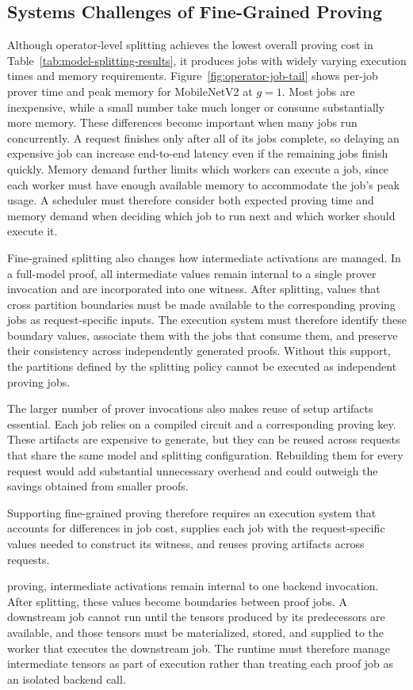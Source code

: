 \subsection{Systems Challenges of Fine-Grained Proving}
Although operator-level splitting achieves the lowest overall proving
cost in Table~\ref{tab:model-splitting-results}, it produces jobs with
widely varying execution times and memory requirements. Figure~\ref{fig:operator-job-tail} shows per-job prover time and
peak memory for MobileNetV2 at \(g=1\).  Most jobs are inexpensive, while a small number take much
longer or consume substantially more memory. These differences become
important when many jobs run concurrently. A request finishes only after
all of its jobs complete, so delaying an expensive job can
increase end-to-end latency even if the remaining jobs finish quickly.
Memory demand further limits which workers can execute a job, since each
worker must have enough available memory to accommodate the job's peak
usage. A scheduler must therefore consider both expected proving time
and memory demand when deciding which job to run next and which worker
should execute it.

Fine-grained splitting also changes how intermediate activations are
managed. In a full-model proof, all intermediate values remain internal
to a single prover invocation and are incorporated into one witness.
After splitting, values that cross partition boundaries must be made
available to the corresponding proving jobs as request-specific inputs.
The execution system must therefore identify these boundary values,
associate them with the jobs that consume them, and preserve their
consistency across independently generated proofs. Without this support,
the partitions defined by the splitting policy cannot be executed as
independent proving jobs.


The larger number of prover invocations also makes reuse of setup
artifacts essential. Each job relies on a compiled circuit and a
corresponding proving key. These artifacts are expensive to generate, but
they can be reused across requests that share the same model and
splitting configuration. Rebuilding them for every request would add
substantial unnecessary overhead and could outweigh the savings obtained
from smaller proofs.

Supporting fine-grained proving therefore requires an execution system
that accounts for differences in job cost, supplies each job with the
request-specific values needed to construct its witness, and reuses
proving artifacts across requests.

proving, intermediate activations remain internal to one backend invocation. After splitting, these values become boundaries between proof jobs. A downstream job cannot run until the tensors produced by its predecessors are available, and those tensors must be materialized, stored, and supplied to the worker that executes the downstream job. The runtime must therefore manage intermediate tensors as part of execution rather than treating each proof job as an isolated backend call.


\label{sec-partition-characterization-results}